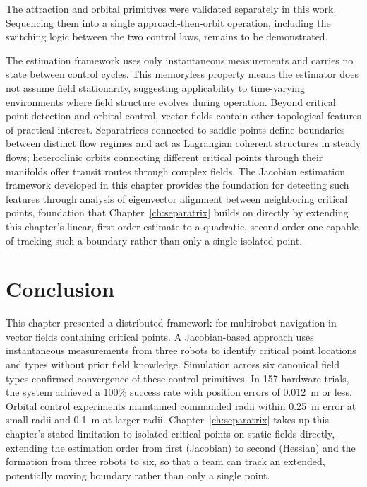 \documentclass[12pt, letterpaper, oneside]{report}
\begin{document}
The attraction and orbital primitives were validated separately in this
work. Sequencing them into a single approach-then-orbit operation,
including the switching logic between the two control laws, remains to
be demonstrated.

The estimation framework uses only instantaneous measurements and carries
no state between control cycles. This memoryless property means the
estimator does not assume field stationarity, suggesting applicability to
time-varying environments where field structure evolves during operation.
Beyond critical point detection and orbital control, vector fields contain
other topological features of practical interest. Separatrices connected to
saddle points define boundaries between distinct flow regimes and act as
Lagrangian coherent structures in steady flows; heteroclinic orbits
connecting different critical points through their manifolds offer transit
routes through complex fields. The Jacobian estimation framework developed
in this chapter provides the foundation for detecting such features through
analysis of eigenvector alignment between neighboring critical points,
foundation that Chapter~\ref{ch:separatrix} builds on directly by
extending this chapter's linear, first-order estimate to a quadratic,
second-order one capable of tracking such a boundary rather than only a
single isolated point.

\section{Conclusion}

This chapter presented a distributed framework for multirobot navigation in
vector fields containing critical points. A Jacobian-based approach uses
instantaneous measurements from three robots to identify critical point
locations and types without prior field knowledge. Simulation across six
canonical field types confirmed convergence of these control primitives. In
157 hardware trials, the system achieved a 100\% success rate with position
errors of 0.012~m or less. Orbital control experiments maintained commanded
radii within 0.25~m error at small radii and 0.1~m at larger radii.
Chapter~\ref{ch:separatrix} takes up this chapter's stated limitation to
isolated critical points on static fields directly, extending the
estimation order from first (Jacobian) to second (Hessian) and the
formation from three robots to six, so that a team can track an extended,
potentially moving boundary rather than only a single point.
\end{document}
